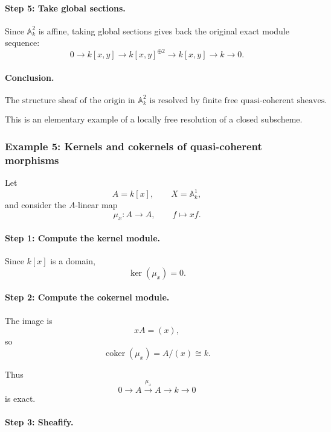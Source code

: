 \documentclass[12pt,a4paper]{article}
\theoremstyle{notespace}
\begin{document}
\paragraph{Step 5: Take global sections.}

Since \(\mathbb{A}^{2}_{k}\) is affine, taking global sections gives back the
original exact module sequence:
\[
0
\longrightarrow
k[x,y]
\longrightarrow
k[x,y]^{\oplus 2}
\longrightarrow
k[x,y]
\longrightarrow
k
\longrightarrow
0.
\]

\paragraph{Conclusion.}

\[
\boxed{
	\text{The structure sheaf of the origin in }\mathbb{A}^{2}_{k}
	\text{ is resolved by finite free quasi-coherent sheaves.}
}
\]

This is an elementary example of a locally free resolution of a closed
subscheme.

\subsubsection{Example 5: Kernels and cokernels of quasi-coherent morphisms}

Let
\[
A=k[x],
\qquad
X=\mathbb{A}^{1}_{k},
\]
and consider the \(A\)-linear map
\[
\mu_{x}:A\longrightarrow A,
\qquad
f\longmapsto xf.
\]

\paragraph{Step 1: Compute the kernel module.}

Since \(k[x]\) is a domain,
\[
\ker(\mu_{x})=0.
\]

\paragraph{Step 2: Compute the cokernel module.}

The image is
\[
xA=(x),
\]
so
\[
\operatorname{coker}(\mu_{x})
=
A/(x)
\cong
k.
\]

Thus
\[
0
\longrightarrow
A
\xrightarrow{\mu_{x}}
A
\longrightarrow
k
\longrightarrow
0
\]
is exact.

\paragraph{Step 3: Sheafify.}
\end{document}
